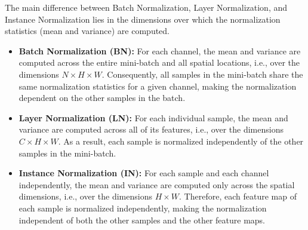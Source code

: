 The main difference between Batch Normalization, Layer Normalization, and Instance Normalization lies in the dimensions over which the normalization statistics (mean and variance) are computed.
\begin{itemize}
    \item \textbf{Batch Normalization (BN):} For each channel, the mean and variance are computed across the entire mini-batch and all spatial locations, i.e., over the dimensions $N \times H \times W$. Consequently, all samples in the mini-batch share the same normalization statistics for a given channel, making the normalization dependent on the other samples in the batch.

    \item \textbf{Layer Normalization (LN):} For each individual sample, the mean and variance are computed across all of its features, i.e., over the dimensions $C \times H \times W$. As a result, each sample is normalized independently of the other samples in the mini-batch.

    \item \textbf{Instance Normalization (IN):} For each sample and each channel independently, the mean and variance are computed only across the spatial dimensions, i.e., over the dimensions $H \times W$. Therefore, each feature map of each sample is normalized independently, making the normalization independent of both the other samples and the other feature maps.
\end{itemize}